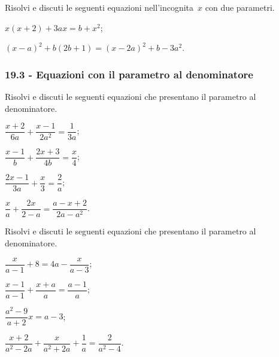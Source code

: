 \begin{esercizio}[\Ast]
\label{ese:19.10}
Risolvi e discuti le seguenti equazioni nell'incognita~$x$ con due parametri.
\begin{enumeratea}
 \item $x(x+2)+3ax=b+x^{2}$;
 \item $(x-a)^{2}+b(2b+1)=(x-2a)^{2}+b-3a^{2}$.
\end{enumeratea}
\end{esercizio}

\subsubsection*{19.3 - Equazioni con il parametro al denominatore}

\begin{esercizio}[\Ast]
\label{ese:19.11}
Risolvi e discuti le seguenti equazioni che presentano il parametro al denominatore.
\begin{multicols}{2}
\begin{enumeratea}
 \item $\dfrac{x+2}{6a}+\dfrac{x-1}{2a^{2}}=\dfrac{1}{3a}$;
 \item $\dfrac{x-1}{b}+\dfrac{2x+3}{4b}=\dfrac{x}{4}$;
 \item $\dfrac{2x-1}{3a}+\dfrac{x}{3}=\dfrac{2}{a}$;
 \item $\dfrac{x}{a}+\dfrac{2x}{2-a}=\dfrac{a-x+2}{2a-a^{2}}$.
\end{enumeratea}
\end{multicols}
\end{esercizio}

\begin{esercizio}[\Ast]
\label{ese:19.12}
Risolvi e discuti le seguenti equazioni che presentano il parametro al denominatore.
\begin{multicols}{2}
\begin{enumeratea}
 \item $\dfrac{x}{a-1}+8=4a-\dfrac{x}{a-3}$;
 \item $\dfrac{x-1}{a-1}+\dfrac{x+a}{a}=\dfrac{a-1}{a}$;
 \item $\dfrac{a^{2}-9}{a+2}x=a-3$;
 \item $\dfrac{x+2}{a^{2}-2a}+\dfrac{x}{a^{2}+2a}+\dfrac{1}{a}=\dfrac{2}{a^{2}-4}$.
\end{enumeratea}
\end{multicols}
\end{esercizio}

